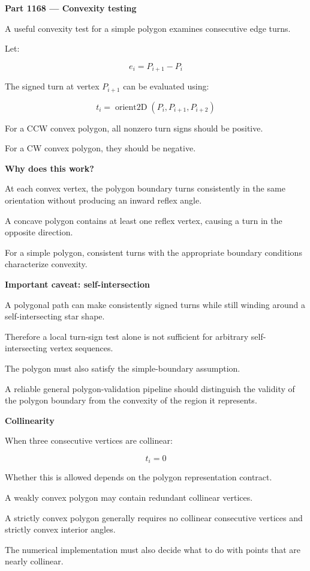 \textbf{Part 1168 --- Convexity testing}

A useful convexity test for a simple polygon examines consecutive edge turns.

Let:

\[
e_i=P_{i+1}-P_i
\]

The signed turn at vertex \(P_{i+1}\) can be evaluated using:

\[
\boxed{ t_i=\operatorname{orient2D}(P_i,P_{i+1},P_{i+2}) }
\]

For a CCW convex polygon, all nonzero turn signs should be positive.

For a CW convex polygon, they should be negative.

\textbf{Why does this work?}

At each convex vertex, the polygon boundary turns consistently in the same orientation without producing an inward reflex angle.

A concave polygon contains at least one reflex vertex, causing a turn in the opposite direction.

For a simple polygon, consistent turns with the appropriate boundary conditions characterize convexity.

\textbf{Important caveat: self-intersection}

A polygonal path can make consistently signed turns while still winding around a self-intersecting star shape.

Therefore a local turn-sign test alone is not sufficient for arbitrary self-intersecting vertex sequences.

The polygon must also satisfy the simple-boundary assumption.

A reliable general polygon-validation pipeline should distinguish the validity of the polygon boundary from the convexity of the region it represents.

\textbf{Collinearity}

When three consecutive vertices are collinear:

\[
t_i=0
\]

Whether this is allowed depends on the polygon representation contract.

A weakly convex polygon may contain redundant collinear vertices.

A strictly convex polygon generally requires no collinear consecutive vertices and strictly convex interior angles.

The numerical implementation must also decide what to do with points that are nearly collinear.

